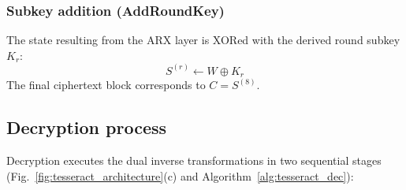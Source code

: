\documentclass[10pt,twocolumn]{article}
\begin{document}
\subsubsection{Subkey addition (AddRoundKey)}
The state resulting from the ARX layer is XORed with the derived round subkey $K_r$:
\begin{equation}
    S^{(r)} \leftarrow W \oplus K_r
\end{equation}
The final ciphertext block corresponds to $C = S^{(8)}$.

\subsection{Decryption process}
Decryption executes the dual inverse transformations in two sequential stages (Fig.~\ref{fig:tesseract_architecture}(c) and Algorithm~\ref{alg:tesseract_dec}):
\end{document}
